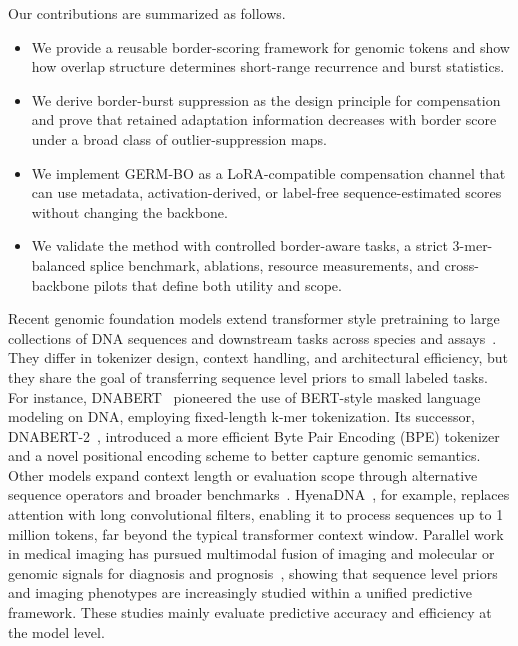 \documentclass[12pt,letterpaper]{article}
\begin{document}
Our contributions are summarized as follows.
\begin{itemize}
\item We provide a reusable border-scoring framework for genomic tokens and show how overlap structure determines short-range recurrence and burst statistics.
\item We derive border-burst suppression as the design principle for compensation and prove that retained adaptation information decreases with border score under a broad class of outlier-suppression maps.
\item We implement GERM-BO as a LoRA-compatible compensation channel that can use metadata, activation-derived, or label-free sequence-estimated scores without changing the backbone.
\item We validate the method with controlled border-aware tasks, a strict 3-mer-balanced splice benchmark, ablations, resource measurements, and cross-backbone pilots that define both utility and scope.
\end{itemize}

Recent genomic foundation models extend transformer style pretraining to large collections of DNA sequences and downstream tasks across species and assays~\cite{dnabert2021,dnabert22023,nucleotidetransformer2024,hyenadna2024,genomicsurvey2025}. They differ in tokenizer design, context handling, and architectural efficiency, but they share the goal of transferring sequence level priors to small labeled tasks. For instance, DNABERT~\cite{dnabert2021} pioneered the use of BERT-style masked language modeling on DNA, employing fixed-length k-mer tokenization. Its successor, DNABERT-2~\cite{dnabert22023}, introduced a more efficient Byte Pair Encoding (BPE) tokenizer and a novel positional encoding scheme to better capture genomic semantics. Other models expand context length or evaluation scope through alternative sequence operators and broader benchmarks~\cite{hyenadna2024,genomicsurvey2025}. HyenaDNA~\cite{hyenadna2024}, for example, replaces attention with long convolutional filters, enabling it to process sequences up to 1 million tokens, far beyond the typical transformer context window. Parallel work in medical imaging has pursued multimodal fusion of imaging and molecular or genomic signals for diagnosis and prognosis~\cite{wei2023tmi,chen2022pathomic,imaginggenetics2022,hmf2022}, showing that sequence level priors and imaging phenotypes are increasingly studied within a unified predictive framework. These studies mainly evaluate predictive accuracy and efficiency at the model level.
\end{document}
